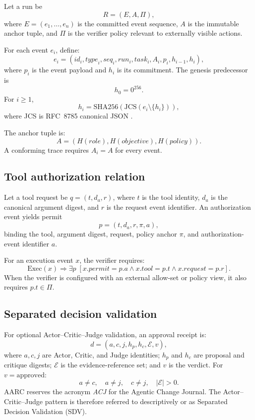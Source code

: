 \documentclass{article}
\begin{document}
Let a run be
\[
  R = (E, A, \Pi),
\]
where $E=(e_1,\ldots,e_n)$ is the committed event sequence, $A$ is the immutable
anchor tuple, and $\Pi$ is the verifier policy relevant to externally visible
actions.

For each event $e_i$, define:
\[
 e_i =
 (\mathit{id}_i,\mathit{type}_i,\mathit{seq}_i,\mathit{run}_i,
  \mathit{task}_i,A_i,p_i,h_{i-1},h_i),
\]
where $p_i$ is the event payload and $h_i$ is its commitment.
The genesis predecessor is
\[
 h_0 = 0^{256}.
\]
For $i\ge1$,
\[
 h_i =
 \mathrm{SHA256}\left(
   \mathrm{JCS}\left(e_i \setminus \{h_i\}\right)
 \right),
\]
where JCS is RFC~8785 canonical JSON \cite{rfc8785}.

The anchor tuple is:
\[
 A =
 \left(
 H(\mathit{role}),
 H(\mathit{objective}),
 H(\mathit{policy})
 \right).
\]
A conforming trace requires $A_i=A$ for every event.

\subsection{Tool authorization relation}

Let a tool request be $q=(t,d_a,r)$, where $t$ is the tool identity, $d_a$ is
the canonical argument digest, and $r$ is the request event identifier.
An authorization event yields permit
\[
 p=(t,d_a,r,\pi,a),
\]
binding the tool, argument digest, request, policy anchor $\pi$, and
authorization-event identifier $a$.

For an execution event $x$, the verifier requires:
\[
 \mathrm{Exec}(x) \Rightarrow
 \exists p \;[
   x.\mathit{permit}=p.a \land
   x.\mathit{tool}=p.t \land
   x.\mathit{request}=p.r
 ].
\]
When the verifier is configured with an external allow-set or policy view, it
also requires $p.t\in\Pi$.

\subsection{Separated decision validation}

For optional Actor--Critic--Judge validation, an approval receipt is:
\[
 d=(a,c,j,h_p,h_c,\mathcal{E},v),
\]
where $a,c,j$ are Actor, Critic, and Judge identities; $h_p$ and $h_c$ are
proposal and critique digests; $\mathcal{E}$ is the evidence-reference set; and
$v$ is the verdict. For $v=\mathrm{approved}$:
\[
 a\ne c,\quad a\ne j,\quad c\ne j,\quad |\mathcal{E}|>0.
\]
AARC reserves the acronym \emph{ACJ} for the Agentic Change Journal. The
Actor--Critic--Judge pattern is therefore referred to descriptively or as
Separated Decision Validation (SDV).
\end{document}
